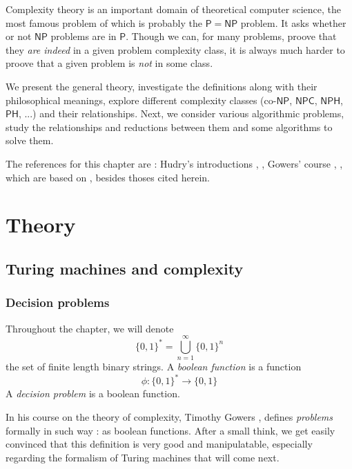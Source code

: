 Complexity theory is an important domain of theoretical computer science, the most famous problem of which is probably the \og $ \mathsf P = \mathsf{NP} $ \fg problem. It asks whether or not $ \mathsf{NP} $ problems are in $ \mathsf P $. Though we can, for many problems, proove that they \textit{are indeed} in a given problem complexity class, it is always much harder to proove that a given problem is \textit{not} in some class.

We present the general theory, investigate the definitions along with their philosophical meanings, explore different complexity classes (co-$ \mathsf{NP} $, $ \mathsf{NPC} $, $ \mathsf{NPH} $, $ \mathsf{PH} $, ...) and their relationships. Next, we consider various algorithmic problems, study the relationships and reductions between them and some algorithms to solve them.

The references for this chapter are : Hudry's introductions \cite{charonhudry2019}, \cite{hudry2024}, Gowers' course \cite{gowers2023}, \cite{gowers2024}, which are based on \cite{} , besides thoses cited herein.

\section{Theory}

\subsection{Turing machines and complexity}

\subsubsection{Decision problems}

\begin{definition}
    Throughout the chapter, we will denote
    \[
    \{0,1\}^* = \bigcup_{n=1}^\infty \{0,1\}^n
    \]
    the set of finite length binary strings.
    A \textit{boolean function} is a function
    \[
    \phi : \{0,1\}^* \to \{0,1\}
    \]
    A \textit{decision problem} is a boolean function.
\end{definition}

In his course on the theory of complexity, Timothy Gowers \cite{gowers2023}, \cite{gowers2024} defines \textit{problems} formally in such way : as boolean functions. After a small think, we get easily convinced that this definition is very good and manipulatable, especially regarding the formalism of Turing machines that will come next.

